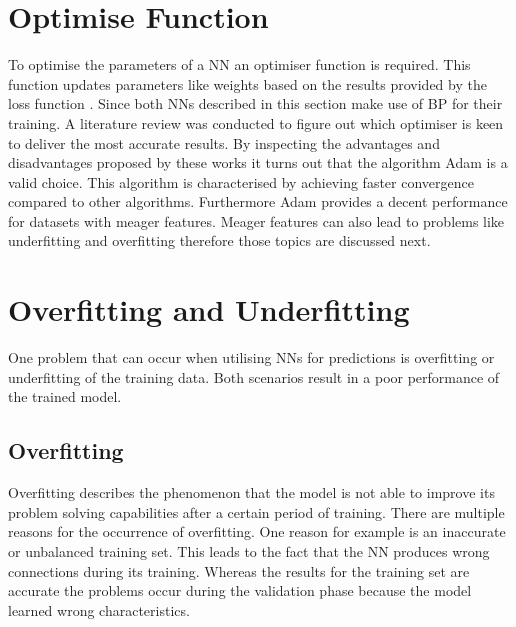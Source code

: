 \section{Optimise Function}
\label{sec:optimize_func}
To optimise the parameters of a NN an optimiser function is required. This function updates parameters like weights based on the results provided by the loss function \cite{optimizer}. Since both NNs described in this section make use of BP for their training. A literature review was conducted to figure out which optimiser is keen to deliver the most accurate results. By inspecting the advantages and disadvantages proposed by these works \cite{optimizer}\cite{otimizer_1}\cite{optimizer_2} it turns out that the algorithm Adam is a valid choice. This algorithm is characterised by achieving faster convergence compared to other algorithms. Furthermore Adam provides a decent performance for datasets with meager features.
Meager features can also lead to problems like underfitting and overfitting therefore those topics are discussed next. 

\section{Overfitting and Underfitting}
One problem that can occur when utilising NNs for predictions is overfitting or underfitting of the training data. Both scenarios result in a poor performance of the trained model. \cite{fitting} 
\subsection{Overfitting}

Overfitting describes the phenomenon that the model is not able to improve its problem solving capabilities after a certain period of training. There are multiple reasons for the occurrence of overfitting. One reason for example is an inaccurate or unbalanced training set. This leads to the fact that the NN produces wrong connections during its training.  Whereas the results for the training set are accurate the problems  occur during the validation phase because the model learned wrong characteristics. \cite{fitting} 
